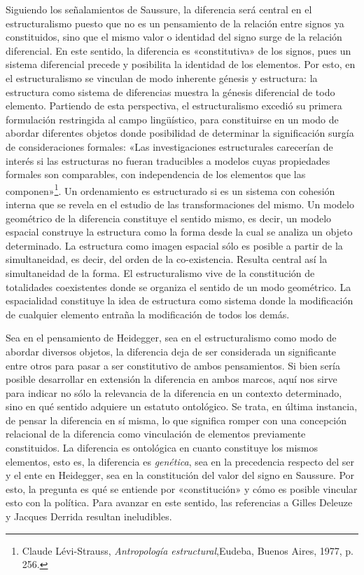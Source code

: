 Siguiendo los señalamientos de Saussure, la diferencia será central en el estructuralismo puesto que no es un pensamiento de la relación entre signos ya constituidos, sino que el mismo valor o identidad del signo surge de la relación diferencial. En este sentido, la diferencia es «constitutiva» de los signos, pues un sistema diferencial precede y posibilita la identidad de los elementos. Por esto, en el estructuralismo se vinculan de modo inherente génesis y estructura: la estructura como sistema de diferencias muestra la génesis diferencial de todo elemento. Partiendo de esta perspectiva, el estructuralismo excedió su primera formulación restringida al campo lingüístico, para constituirse en un modo de abordar diferentes objetos donde posibilidad de determinar la significación surgía de consideraciones formales: «Las investigaciones estructurales carecerían de interés si las estructuras no fueran traducibles a modelos cuyas propiedades formales son comparables, con independencia de los elementos que las componen»\footnote{Claude Lévi-Strauss, \emph{Antropología estructural},Eudeba, Buenos Aires, 1977, p. 256.}. Un ordenamiento es estructurado si es un sistema con cohesión interna que se revela en el estudio de las transformaciones del mismo. Un modelo geométrico de la diferencia constituye el sentido mismo, es decir, un modelo espacial construye la estructura como la forma desde la cual se analiza un objeto determinado. La estructura como imagen espacial sólo es posible a partir de la simultaneidad, es decir, del orden de la co-existencia. Resulta central así la simultaneidad de la forma. El estructuralismo vive de la constitución de totalidades coexistentes donde se organiza el sentido de un modo geométrico. La espacialidad constituye la idea de estructura como sistema donde la modificación de cualquier elemento entraña la modificación de todos los demás.

Sea en el pensamiento de Heidegger, sea en el estructuralismo como modo de abordar diversos objetos, la diferencia deja de ser considerada un significante entre otros para pasar a ser constitutivo de ambos pensamientos. Si bien sería posible desarrollar en extensión la diferencia en ambos marcos, aquí nos sirve para indicar no sólo la relevancia de la diferencia en un contexto determinado, sino en qué sentido adquiere un estatuto ontológico. Se trata, en última instancia, de pensar la diferencia en sí misma, lo que significa romper con una concepción relacional de la diferencia como vinculación de elementos previamente constituidos. La diferencia es ontológica en cuanto constituye los mismos elementos, esto es, la diferencia es \emph{genética}, sea en la precedencia respecto del ser y el ente en Heidegger, sea en la constitución del valor del signo en Saussure. Por esto, la pregunta es qué se entiende por «constitución» y cómo es posible vincular esto con la política. Para avanzar en este sentido, las referencias a Gilles Deleuze y Jacques Derrida resultan ineludibles.

